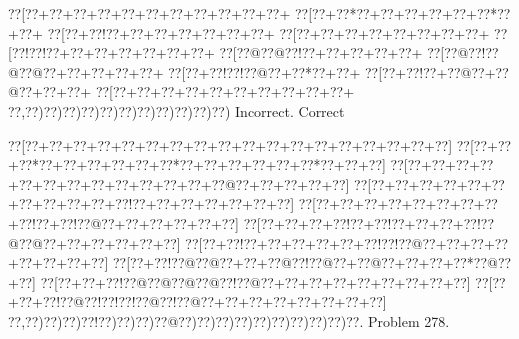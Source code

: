 \documentclass[a5paper]{article}
\begin{document}
\begin{center}
{\goo
\0??[\0??+\0??+\0??+\0??+\0??+\0??+\0??+\0??+\0??+\0??+\0??+
\0??[\0??+\0??*\0??+\0??+\0??+\0??+\0??+\0??*\0??+\0??+
\0??[\0??+\0??!\0??+\0??+\0??+\0??+\0??+\0??+\0??+
\0??[\0??+\0??+\0??+\0??+\0??+\0??+\0??+\0??+
\0??[\0??!\0??!\0??+\0??+\0??+\0??+\0??+\0??+\0??+
\0??[\0??@\0??@\0??!\0??+\0??+\0??+\0??+\0??+
\0??[\0??@\0??!\0??@\0??@\0??+\0??+\0??+\0??+\0??+
\0??[\0??+\0??!\0??!\0??@\0??+\0??*\0??+\0??+
\0??[\0??+\0??!\0??+\0??@\0??+\0??@\0??+\0??+\0??+
\0??[\0??+\0??+\0??+\0??+\0??+\0??+\0??+\0??+\0??+\0??+
\0??,\0??)\0??)\0??)\0??)\0??)\0??)\0??)\0??)\0??)\0??)\0??)
}
Incorrect. Correct

\end{center}
\newpage
\begin{center}
{\goo
\0??[\0??+\0??+\0??+\0??+\0??+\0??+\0??+\0??+\0??+\0??+\0??+\0??+\0??+\0??+\0??+\0??+\0??+\0??]
\0??[\0??+\0??+\0??*\0??+\0??+\0??+\0??+\0??+\0??*\0??+\0??+\0??+\0??+\0??+\0??*\0??+\0??+\0??]
\0??[\0??+\0??+\0??+\0??+\0??+\0??+\0??+\0??+\0??+\0??+\0??+\0??+\0??@\0??+\0??+\0??+\0??+\0??]
\0??[\0??+\0??+\0??+\0??+\0??+\0??+\0??+\0??+\0??+\0??+\0??!\0??+\0??+\0??+\0??+\0??+\0??+\0??]
\0??[\0??+\0??+\0??+\0??+\0??+\0??+\0??+\0??+\0??!\0??+\0??!\0??@\0??+\0??+\0??+\0??+\0??+\0??]
\0??[\0??+\0??+\0??+\0??!\0??+\0??!\0??+\0??+\0??+\0??!\0??@\0??@\0??+\0??+\0??+\0??+\0??+\0??]
\0??[\0??+\0??!\0??+\0??+\0??+\0??+\0??+\0??!\0??!\0??@\0??+\0??+\0??+\0??+\0??+\0??+\0??+\0??]
\0??[\0??+\0??!\0??@\0??@\0??+\0??+\0??@\0??!\0??@\0??+\0??@\0??+\0??+\0??+\0??*\0??@\0??+\0??]
\0??[\0??+\0??+\0??!\0??@\0??@\0??@\0??@\0??!\0??@\0??+\0??+\0??+\0??+\0??+\0??+\0??+\0??+\0??]
\0??[\0??+\0??+\0??!\0??@\0??!\0??!\0??!\0??@\0??!\0??@\0??+\0??+\0??+\0??+\0??+\0??+\0??+\0??]
\0??,\0??)\0??)\0??)\0??!\0??)\0??)\0??)\0??@\0??)\0??)\0??)\0??)\0??)\0??)\0??)\0??)\0??)\0??.
}
Problem 278.

\end{center}
\end{document}
